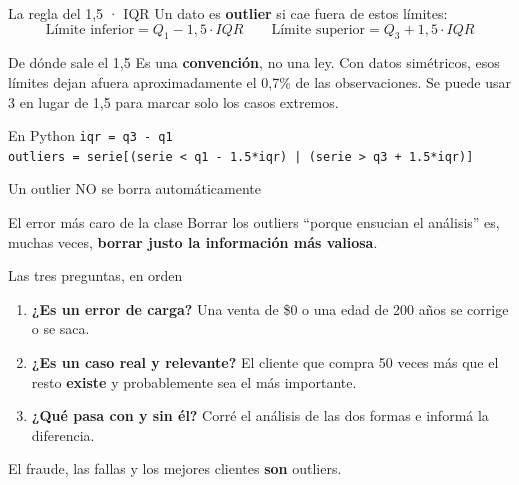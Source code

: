 \documentclass[aspectratio=169,10pt]{beamer}
\begin{document}
\begin{frame}{La regla del 1,5 · IQR}
  Un dato es \textbf{outlier} si cae fuera de estos límites:
  \[ \text{Límite inferior} = Q_1 - 1{,}5 \cdot IQR \qquad
     \text{Límite superior} = Q_3 + 1{,}5 \cdot IQR \]

  \begin{block}{De dónde sale el 1,5}
    Es una \textbf{convención}, no una ley. Con datos simétricos, esos límites dejan afuera
    aproximadamente el 0,7\% de las observaciones. Se puede usar 3 en lugar de 1,5 para marcar
    solo los casos extremos.
  \end{block}

  \begin{exampleblock}{En Python}
    \texttt{iqr = q3 - q1} \\
    \texttt{outliers = serie[(serie < q1 - 1.5*iqr) | (serie > q3 + 1.5*iqr)]}
  \end{exampleblock}
\end{frame}

\begin{frame}{Un outlier NO se borra automáticamente}
  \begin{alertblock}{El error más caro de la clase}
    Borrar los outliers ``porque ensucian el análisis'' es, muchas veces, \textbf{borrar
    justo la información más valiosa}.
  \end{alertblock}
  \vspace{0.3em}
  \begin{block}{Las tres preguntas, en orden}
    \begin{enumerate}
      \item \textbf{¿Es un error de carga?} Una venta de \$0 o una edad de 200 años se corrige o se saca.
      \item \textbf{¿Es un caso real y relevante?} El cliente que compra 50 veces más que el resto
            \textbf{existe} y probablemente sea el más importante.
      \item \textbf{¿Qué pasa con y sin él?} Corré el análisis de las dos formas e informá la diferencia.
    \end{enumerate}
  \end{block}
  \begin{center}\small El fraude, las fallas y los mejores clientes \textbf{son} outliers.\end{center}
\end{frame}
\end{document}
